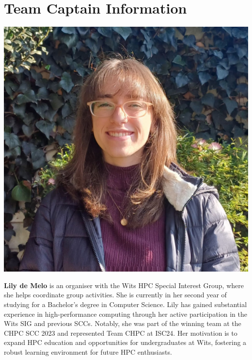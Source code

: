 \documentclass[10pt, onecolumn]{IEEEtran}
\begin{document}
\section{Team Captain Information}
\noindent
\begin{minipage}{0.2\textwidth}
  \includegraphics[width=\textwidth]{lily_photo.jpg}
\end{minipage}
\hspace{0.02\textwidth} %
\begin{minipage}{0.65\textwidth}
  \textbf{Lily de Melo} is an organiser with the Wits HPC Special Interest Group, where she helps coordinate group activities. She is currently in her second year of studying for a Bachelor's degree in Computer Science. Lily has gained substantial experience in high-performance computing through her active participation in the Wits SIG and previous SCCs. Notably, she was part of the winning team at the CHPC SCC 2023 and represented Team CHPC at ISC24. Her motivation is to expand HPC education and opportunities for undergraduates at Wits, fostering a robust learning environment for future HPC enthusiasts.
\end{minipage}
\\\\
\end{document}

